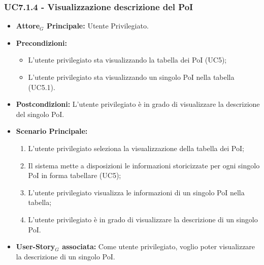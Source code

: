 \documentclass[11pt]{article}
\begin{document}
\begin{justify}
\subsubsection{\textbf{UC7.1.4 - Visualizzazione descrizione del PoI}}
\label{UC7.1.4}
\begin{itemize}
    \item \textbf{Attore$_G$ Principale:} Utente Privilegiato.
    \item \textbf{Precondizioni:} 
        \begin{itemize}
          \item L'utente privilegiato sta visualizzando la tabella dei PoI (UC5);
            \item L'utente privilegiato sta visualizzando un singolo PoI nella tabella (UC5.1).
        \end{itemize}
      \item \textbf{Postcondizioni:} L'utente privilegiato è in grado di visualizzare la descrizione del singolo PoI.\\
    \item \textbf{Scenario Principale:} 
        \begin{enumerate}
        \item L'utente privilegiato seleziona la visualizzazione della tabella dei PoI;
          \item Il sistema mette a disposizioni le informazioni storicizzate per ogni singolo PoI in forma tabellare (UC5);
          \item L'utente privilegiato visualizza le informazioni di un singolo PoI nella tabella;
            \item L'utente privilegiato è in grado di visualizzare la descrizione di un singolo PoI.
        \end{enumerate}
    \item \textbf{User-Story$_G$ associata:} Come utente privilegiato, voglio poter visualizzare la descrizione di un singolo PoI.
\end{itemize}

\end{justify}
\end{document}
